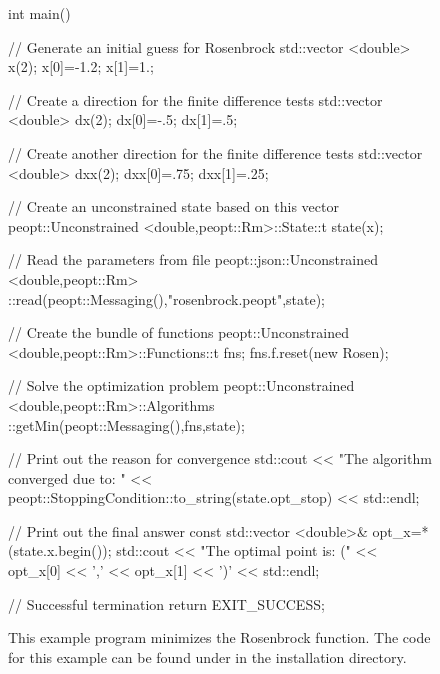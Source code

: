 \begin{figure}
    \ContinuedFloat
    \begin{lstCpp}
int main(){
    // Generate an initial guess for Rosenbrock
    std::vector <double> x(2);
    x[0]=-1.2; x[1]=1.;

    // Create a direction for the finite difference tests
    std::vector <double> dx(2);
    dx[0]=-.5; dx[1]=.5;

    // Create another direction for the finite difference tests
    std::vector <double> dxx(2);
    dxx[0]=.75; dxx[1]=.25;

    // Create an unconstrained state based on this vector
    peopt::Unconstrained <double,peopt::Rm>::State::t state(x);

    // Read the parameters from file
    peopt::json::Unconstrained <double,peopt::Rm>
        ::read(peopt::Messaging(),"rosenbrock.peopt",state);

    // Create the bundle of functions 
    peopt::Unconstrained <double,peopt::Rm>::Functions::t fns;
    fns.f.reset(new Rosen);

    // Solve the optimization problem
    peopt::Unconstrained <double,peopt::Rm>::Algorithms
        ::getMin(peopt::Messaging(),fns,state);

    // Print out the reason for convergence
    std::cout << "The algorithm converged due to: " <<
        peopt::StoppingCondition::to_string(state.opt_stop) <<
        std::endl;

    // Print out the final answer
    const std::vector <double>& opt_x=*(state.x.begin());
    std::cout << "The optimal point is: (" << opt_x[0] << ','
        << opt_x[1] << ')' << std::endl;

    // Successful termination
    return EXIT_SUCCESS;
}
\end{lstCpp}
    \caption{This example program minimizes the Rosenbrock function.  The code for this example can be found under \protect{} in the installation directory.}
    \label{fig:Rosen}
\end{figure}
